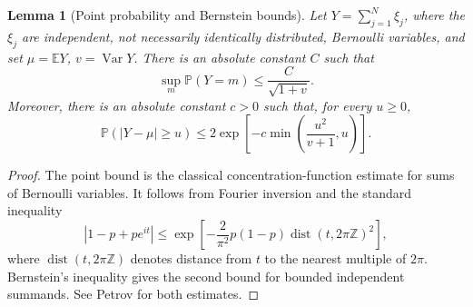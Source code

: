 \documentclass[11pt]{article}
\newtheorem{lemma}[theorem]{Lemma}
\theoremstyle{remark}
\newcommand{\Pp}{\mathbb P}
\newcommand{\Ee}{\mathbb E}
\newcommand{\Var}{\operatorname{Var}}
\begin{document}
\begin{lemma}[Point probability and Bernstein bounds]\label{lem:bernstein-point}
Let \(Y=\sum_{j=1}^N \xi_j\), where the \(\xi_j\) are independent, not necessarily identically distributed, Bernoulli variables, and set \(\mu=\Ee Y\), \(v=\Var Y\).  There is an absolute constant \(C\) such that
\[
        \sup_m \Pp(Y=m)\le \frac{C}{\sqrt{1+v}}.
\]
Moreover, there is an absolute constant \(c>0\) such that, for every \(u\ge0\),
\[
        \Pp(|Y-\mu|\ge u)\le
        2\exp\left[-c\min\left(\frac{u^2}{v+1},u\right)\right].
\]
\end{lemma}

\begin{proof}
The point bound is the classical concentration-function estimate for sums of Bernoulli variables.  It follows from Fourier inversion and the standard inequality
\[
        |1-p+pe^{it}|
        \le \exp\left[-\frac{2}{\pi^2}p(1-p)\operatorname{dist}(t,2\pi\mathbb Z)^2\right],
\]
where \(\operatorname{dist}(t,2\pi\mathbb Z)\) denotes distance from \(t\) to the nearest multiple of \(2\pi\).  Bernstein's inequality gives the second bound for bounded independent summands.  See Petrov \cite[Chapter VII]{Petrov1975} for both estimates.
\end{proof}
\end{document}

